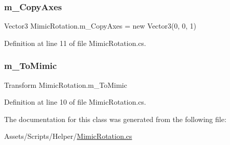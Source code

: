\subsubsection{\texorpdfstring{m\+\_\+\+Copy\+Axes}{m\_CopyAxes}}
{\footnotesize\ttfamily Vector3 Mimic\+Rotation.\+m\+\_\+\+Copy\+Axes = new Vector3(0, 0, 1)}



Definition at line 11 of file Mimic\+Rotation.\+cs.

\mbox{\label{class_mimic_rotation_aceb458accbca1a008cf80a6368fad37e}} 
\subsubsection{\texorpdfstring{m\+\_\+\+To\+Mimic}{m\_ToMimic}}
{\footnotesize\ttfamily Transform Mimic\+Rotation.\+m\+\_\+\+To\+Mimic}



Definition at line 10 of file Mimic\+Rotation.\+cs.



The documentation for this class was generated from the following file\+:\begin{DoxyCompactItemize}
\item 
Assets/\+Scripts/\+Helper/\mbox{\hyperlink{_mimic_rotation_8cs}{Mimic\+Rotation.\+cs}}\end{DoxyCompactItemize}
